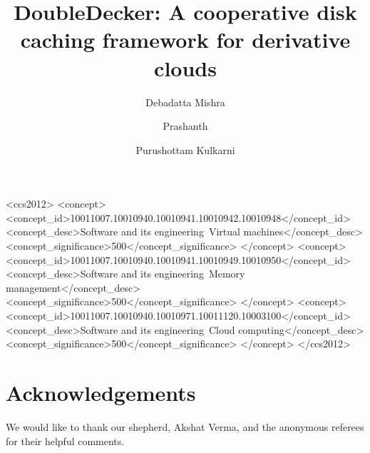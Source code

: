 \documentclass[sigplan]{acmart}
\begin{document}
\title{DoubleDecker: A cooperative disk caching framework for derivative clouds}
\author{Debadatta Mishra}


\author{Prashanth}

\author{Purushottam Kulkarni}




 \begin{CCSXML}
<ccs2012>
<concept>
<concept_id>10011007.10010940.10010941.10010942.10010948</concept_id>
<concept_desc>Software and its engineering~Virtual machines</concept_desc>
<concept_significance>500</concept_significance>
</concept>
<concept>
<concept_id>10011007.10010940.10010941.10010949.10010950</concept_id>
<concept_desc>Software and its engineering~Memory management</concept_desc>
<concept_significance>500</concept_significance>
</concept>
<concept>
<concept_id>10011007.10010940.10010971.10011120.10003100</concept_id>
<concept_desc>Software and its engineering~Cloud computing</concept_desc>
<concept_significance>500</concept_significance>
</concept>
</ccs2012>
\end{CCSXML}


\maketitle









\section*{Acknowledgements}
We would like to thank our shepherd, Akshat Verma,
and the anonymous referees for their helpful comments.


\end{document}

